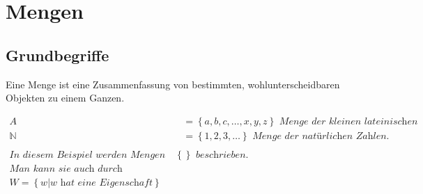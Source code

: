 \section{Mengen}

\subsection{Grundbegriffe}
\begin{defi}
Eine Menge ist eine Zusammenfassung von bestimmten, wohlunterscheidbaren Objekten zu einem Ganzen.
\end{defi}

\begin{bsp}
\begin{eqnarray*} 
A&=\left\{a,b,c,\dots ,x,y,z\right\} \textit{ Menge der kleinen lateinischen Buchstaben.} \\
\mathbb{N}&=\left\{1,2,3,\dots\right\} \textit{ Menge der natürlichen Zahlen.} \\
\\
\textit{In diesem Beispiel werden Mengen durch Aufzählung ihrer Objekte in }\left\{ \right\}\textit{ beschrieben.} \\
\textit{Man kann sie auch durch Eigenschaften beschreiben: }\\
W=\left\{w|\textit{w hat eine Eigenschaft}\right\}
\end{eqnarray*}
\end{bsp}

